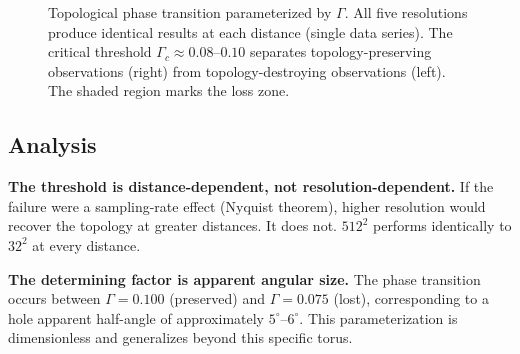 \documentclass[11pt,a4paper]{article}
\theoremstyle{remark}
\begin{document}
\begin{figure}[htbp]
\centering
{}
\caption{Topological phase transition parameterized by $\Gamma$. All five resolutions produce identical results at each distance (single data series). The critical threshold $\Gamma_c \approx 0.08$--$0.10$ separates topology-preserving observations (right) from topology-destroying observations (left). The shaded region marks the loss zone.}
\label{fig:gamma}
\end{figure}

\subsection{Analysis}

\textbf{The threshold is distance-dependent, not resolution-dependent.} If the failure were a sampling-rate effect (Nyquist theorem), higher resolution would recover the topology at greater distances. It does not. $512^2$ performs identically to $32^2$ at every distance.

\textbf{The determining factor is apparent angular size.} The phase transition occurs between $\Gamma = 0.100$ (preserved) and $\Gamma = 0.075$ (lost), corresponding to a hole apparent half-angle of approximately $5^\circ$--$6^\circ$. This parameterization is dimensionless and generalizes beyond this specific torus.
\end{document}
